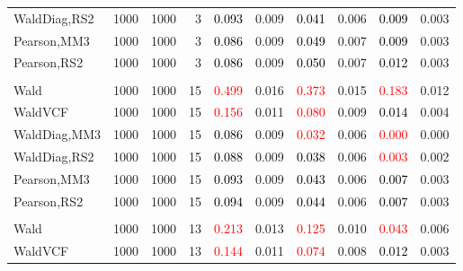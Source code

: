 \documentclass[
]{article}
\begin{document}
\begin{table}[H]
{\begin{tabular}[t]{lrrrrrrlrr}
\hspace{1em}WaldDiag,RS2 & 1000 & 1000 & 3 & \textcolor{black}{0.093} & 0.009 & \textcolor{black}{0.041} & 0.006 & \textcolor{black}{0.009} & 0.003\\
\hspace{1em}Pearson,MM3 & 1000 & 1000 & 3 & \textcolor{black}{0.086} & 0.009 & \textcolor{black}{0.049} & 0.007 & \textcolor{black}{0.009} & 0.003\\
\hspace{1em}Pearson,RS2 & 1000 & 1000 & 3 & \textcolor{black}{0.086} & 0.009 & \textcolor{black}{0.050} & 0.007 & \textcolor{black}{0.012} & 0.003\\
\addlinespace[0.3em]
\multicolumn{10}{l}{\textbf{1F 15V}}\\
\hspace{1em}Wald & 1000 & 1000 & 15 & \textcolor{red}{0.499} & 0.016 & \textcolor{red}{0.373} & 0.015 & \textcolor{red}{0.183} & 0.012\\
\hspace{1em}WaldVCF & 1000 & 1000 & 15 & \textcolor{red}{0.156} & 0.011 & \textcolor{red}{0.080} & 0.009 & \textcolor{black}{0.014} & 0.004\\
\hspace{1em}WaldDiag,MM3 & 1000 & 1000 & 15 & \textcolor{black}{0.086} & 0.009 & \textcolor{red}{0.032} & 0.006 & \textcolor{red}{0.000} & 0.000\\
\hspace{1em}WaldDiag,RS2 & 1000 & 1000 & 15 & \textcolor{black}{0.088} & 0.009 & \textcolor{black}{0.038} & 0.006 & \textcolor{red}{0.003} & 0.002\\
\hspace{1em}Pearson,MM3 & 1000 & 1000 & 15 & \textcolor{black}{0.093} & 0.009 & \textcolor{black}{0.043} & 0.006 & \textcolor{black}{0.007} & 0.003\\
\hspace{1em}Pearson,RS2 & 1000 & 1000 & 15 & \textcolor{black}{0.094} & 0.009 & \textcolor{black}{0.044} & 0.006 & \textcolor{black}{0.007} & 0.003\\
\addlinespace[0.3em]
\multicolumn{10}{l}{\textbf{2F 10V}}\\
\hspace{1em}Wald & 1000 & 1000 & 13 & \textcolor{red}{0.213} & 0.013 & \textcolor{red}{0.125} & 0.010 & \textcolor{red}{0.043} & 0.006\\
\hspace{1em}WaldVCF & 1000 & 1000 & 13 & \textcolor{red}{0.144} & 0.011 & \textcolor{red}{0.074} & 0.008 & \textcolor{black}{0.012} & 0.003\\

\end{tabular}}
\end{table}
\end{document}
